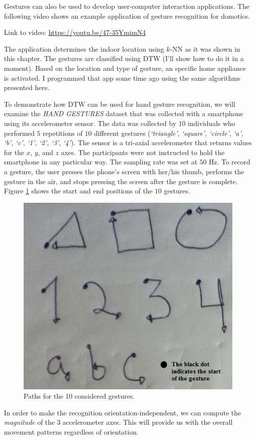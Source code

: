 \documentclass[
  11pt,
]{krantz}
\begin{document}
Gestures can also be used to develop user-computer interaction applications. The following video shows an example application of gesture recognition for domotics.

Link to video: \url{https://youtu.be/47-35YmimN4}

The application determines the indoor location using \(k\)-NN as it was shown in this chapter. The gestures are classified using DTW (I'll show how to do it in a moment). Based on the location and type of gesture, an specific home appliance is activated. I programmed that app some time ago using the same algorithms presented here.

To demonstrate how DTW can be used for hand gesture recognition, we will examine the \emph{HAND GESTURES} dataset that was collected with a smartphone using its accelerometer sensor. The data was collected by \(10\) individuals who performed \(5\) repetitions of \(10\) different gestures (\emph{`triangle'}, \emph{`square'}, \emph{`circle'}, \emph{`a'}, \emph{`b'}, \emph{`c'}, \emph{`1'}, \emph{`2'}, \emph{`3'}, \emph{`4'}). The sensor is a tri-axial accelerometer that returns values for the \(x\), \(y\), and \(z\) axes. The participants were not instructed to hold the smartphone in any particular way. The sampling rate was set at \(50\) Hz. To record a gesture, the user presses the phone's screen with her/his thumb, performs the gesture in the air, and stops pressing the screen after the gesture is complete. Figure \ref{fig:gesturesFigure} shows the start and end positions of the \(10\) gestures.

\begin{figure}

{\centering \includegraphics[width=0.4\linewidth]{images/gestures} 

}

\caption{Paths for the 10 considered gestures.}\label{fig:gesturesFigure}
\end{figure}

In order to make the recognition orientation-independent, we can compute the \emph{magnitude} of the \(3\) accelerometer axes. This will provide us with the overall movement patterns regardless of orientation.
\end{document}
